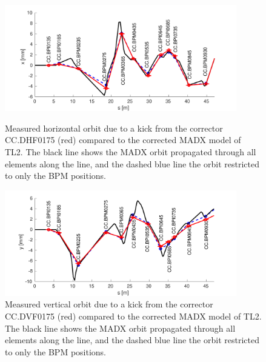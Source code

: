 \begin{figure}
  \centering
  \includegraphics[width=0.9\textwidth]{Figures/optics/modelCorrectedH}
  \caption{Measured horizontal orbit due to a kick from the corrector CC.DHF0175 (red) compared to the corrected MADX model of TL2. The black line shows the MADX orbit propagated through all elements along the line, and the dashed blue line the orbit restricted to only the BPM positions.}
  \label{f:modelCorrectedH}
  \includegraphics[width=0.9\textwidth]{Figures/optics/modelCorrectedV}
  \caption{Measured vertical orbit due to a kick from the corrector CC.DVF0175 (red) compared to the corrected MADX model of TL2. The black line shows the MADX orbit propagated through all elements along the line, and the dashed blue line the orbit restricted to only the BPM positions.}
  \label{f:modelCorrectedV}
\end{figure}

